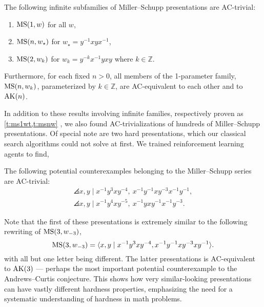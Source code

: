\begin{introtheorem}
        The following infinite subfamilies of Miller--Schupp presentations are AC-trivial:
        \begin{enumerate}[label=(\roman*)]
            \item $\text{MS}(1, w)$ for all $w$,
            \item $\text{MS}(n, w_\star)$ for $w_\star = y^{-1} x y x^{-1}$, 
            \item $\text{MS}(2, w_k)$ for $w_k = y^{-k} x^{-1} y x y$ where $k \in \mathbb{Z}$.
        \end{enumerate}
        Furthermore, for each fixed $n > 0$, all members of the 1-parameter family, $\text{MS}(n, w_k)$, parameterized by $k \in \mathbb{Z}$, are AC-equivalent to each other and to $\text{AK}(n)$.
\end{introtheorem}

In addition to these results involving infinite families, respectively proven as \cref{t:ms1wt,t:msnw} , we also found AC-trivializations of hundreds of Miller--Schupp presentations. Of special note are two hard presentations, which our classical search algorithms could not solve at first. We trained reinforcement learning agents to find,

\begin{introtheorem}\label{thm:MS}
    The following potential counterexamples belonging to the Miller--Schupp series are AC-trivial:
	\begin{gather*}
		\angles{x, y \mid x^{-1} y^3 x y^{-4} , \ x^{-1} y^{-1} x y^{-3} x^{-1} y^{-1}}, \\
		\angles{x, y \mid x^{-1} y^4 x y^{-5} , \ x^{-1} y x y^{-1} x^{-1} y^{-3}}.
	\end{gather*}
\end{introtheorem}

Note that the first of these presentations is extremely similar to the following rewriting of $\text{MS}(3, w_{-3})$,
\[
\text{MS}(3, w_{-3}) = \langle x, y \mid x^{-1} y^3 x y^{-4}, x^{-1} y^{-1} x y^{-3} x y^{-1}\rangle.
\]
with all but one letter being different. The latter presentations is AC-equivalent to $\text{AK}(3)$ --- perhaps the most important potential counterexample to the Andrews--Curtis conjecture.
This shows how very similar-looking presentations can have vastly different hardness properties, emphasizing the need for a systematic understanding of hardness in math problems.

